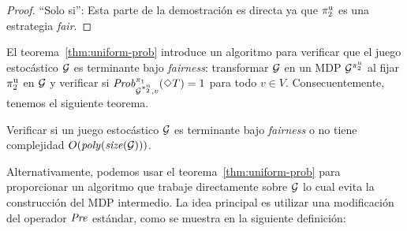 \begin{proof}
\noindent ``Solo si'': Esta parte de la demostración es directa ya que $\pi^{\mathrm{u}}_{2}$ es una estrategia \textit{fair}.
\qedhere
\end{proof} 
\fi

El teorema~\ref{thm:uniform-prob} introduce un algoritmo para verificar que el juego estocástico $\mathcal{G}$ es terminante bajo \textit{fairness}: transformar
$\mathcal{G}$ en un MDP $\mathcal{G}^{\pi^{\mathrm{u}}_{2}}$ al fijar
$\pi^{\mathrm{u}}_{2}$ en $\mathcal{G}$ y verificar si
$\mathit{Prob}^{\pi_{1}}_{\mathcal{G}^{\pi^{\mathrm{u}}_{2}},v}(\Diamond T)=1$ para todo $v\in V$.
%
Consecuentemente, tenemos el siguiente teorema.

\begin{theorem}\label{thm:fair-is-poly}
  Verificar si un juego estocástico $\mathcal{G}$ es terminante bajo
  \textit{fairness} o no tiene complejidad $O(\mathit{poly}(\mathit{size}(\mathcal{G})))$.
\end{theorem}


Alternativamente, podemos usar el teorema~\ref{thm:uniform-prob} para proporcionar un
algoritmo que trabaje directamente sobre $\mathcal{G}$ lo cual evita la construcción del
MDP intermedio.
%
La idea principal es utilizar una modificación del operador $\mathit{Pre}$
estándar, como se muestra en la siguiente definición:

